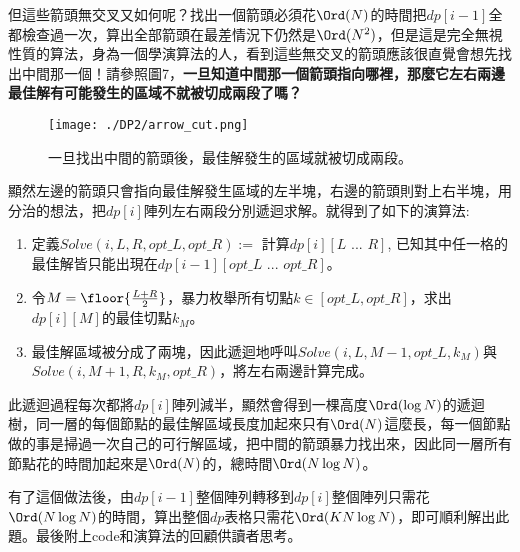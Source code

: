 但這些箭頭無交叉又如何呢？找出一個箭頭必須花$\Ord(N)$的時間把$dp[i - 1]$全都檢查過一次，算出全部箭頭在最差情況下仍然是$\Ord(N^2)$，但是這是完全無視性質的算法，身為一個學演算法的人，看到這些無交叉的箭頭應該很直覺會想先找出中間那一個！請參照圖7，\textbf{一旦知道中間那一個箭頭指向哪裡，那麼它左右兩邊最佳解有可能發生的區域不就被切成兩段了嗎？}

\begin{figure}[h]
	\begin{center}
		\centerline{\texttt{[image: ./DP2/arrow\_cut.png]}}
		\caption{一旦找出中間的箭頭後，最佳解發生的區域就被切成兩段。}
	\end{center}
\end{figure}

顯然左邊的箭頭只會指向最佳解發生區域的左半塊，右邊的箭頭則對上右半塊，用分治的想法，把$dp[i]$陣列左右兩段分別遞迴求解。就得到了如下的演算法:
\begin{enumerate}
    \item 定義$Solve(i, L, R, opt\_L, opt\_R):=$ 計算$dp[i][L\mbox{ ... }R]$, 已知其中任一格的最佳解皆只能出現在$dp[i - 1][opt\_L\mbox{ ... }opt\_R]$。
    \item 令$M=\floor{\frac{L+R}{2}}$，暴力枚舉所有切點$k \in [opt\_L, opt\_R]$，求出$dp[i][M]$的最佳切點$k_M$。
    \item 最佳解區域被分成了兩塊，因此遞迴地呼叫$Solve(i, L, M-1, opt\_L, k_M)$與$Solve(i, M+1, R, k_M, opt\_R)$，將左右兩邊計算完成。
\end{enumerate}
此遞迴過程每次都將$dp[i]$陣列減半，顯然會得到一棵高度$\Ord(\log N)$的遞迴樹，同一層的每個節點的最佳解區域長度加起來只有$\Ord(N)$這麼長，每一個節點做的事是掃過一次自己的可行解區域，把中間的箭頭暴力找出來，因此同一層所有節點花的時間加起來是$\Ord(N)$的，總時間$\Ord(N \log N)$。

有了這個做法後，由$dp[i - 1]$整個陣列轉移到$dp[i]$整個陣列只需花$\Ord(N \log N)$的時間，算出整個$dp$表格只需花$\Ord(KN \log N)$，即可順利解出此題。最後附上code和演算法的回顧供讀者思考。

